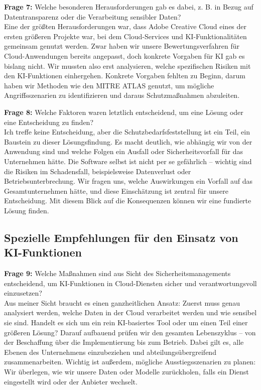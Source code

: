 \documentclass[
    12pt, 
    a4paper,
    ]{scrartcl} %
\begin{document}
\textbf{Frage 7:} Welche besonderen Herausforderungen gab es dabei, z. B. in Bezug auf Datentransparenz oder die Verarbeitung sensibler Daten? \\[0.5em]
Eine der größten Herausforderungen war, dass Adobe Creative Cloud eines der ersten größeren Projekte war, bei dem Cloud-Services und KI-Funktionalitäten gemeinsam genutzt werden. Zwar haben wir unsere Bewertungsverfahren für Cloud-Anwendungen bereits angepasst, doch konkrete Vorgaben für KI gab es bislang nicht. Wir mussten also erst analysieren, welche spezifischen Risiken mit den KI-Funktionen einhergehen. Konkrete Vorgaben fehlten zu Beginn, darum haben wir Methoden wie den MITRE ATLAS genutzt, um mögliche Angriffsszenarien zu identifizieren und daraus Schutzmaßnahmen abzuleiten.

\textbf{Frage 8:} Welche Faktoren waren letztlich entscheidend, um eine Lösung oder eine Entscheidung zu finden? \\[0.5em]
Ich treffe keine Entscheidung, aber die Schutzbedarfsfeststellung ist ein Teil, ein Baustein zu dieser Lösungsfindung. Es macht deutlich, wie abhängig wir von der Anwendung sind und welche Folgen ein Ausfall oder Sicherheitsvorfall für das Unternehmen hätte. Die Software selbst ist nicht per se gefährlich – wichtig sind die Risiken im Schadensfall, beispielsweise Datenverlust oder Betriebsunterbrechung. Wir fragen uns, welche Auswirkungen ein Vorfall auf das Gesamtunternehmen hätte, und diese Einschätzung ist zentral für unsere Entscheidung. Mit diesem Blick auf die Konsequenzen können wir eine fundierte Lösung finden.

\subsection*{Spezielle Empfehlungen für den Einsatz von KI-Funktionen}

\textbf{Frage 9:} Welche Maßnahmen sind aus Sicht des Sicherheitsmanagements entscheidend, um KI-Funktionen in Cloud-Diensten sicher und verantwortungsvoll einzusetzen? \\[0.5em]
Aus meiner Sicht braucht es einen ganzheitlichen Ansatz: Zuerst muss genau analysiert werden, welche Daten in der Cloud verarbeitet werden und wie sensibel sie sind. Handelt es sich um ein rein KI-basiertes Tool oder um einen Teil einer größeren Lösung? Darauf aufbauend prüfen wir den gesamten Lebenszyklus – von der Beschaffung über die Implementierung bis zum Betrieb. Dabei gilt es, alle Ebenen des Unternehmens einzubeziehen und abteilungsübergreifend zusammenarbeiten. Wichtig ist außerdem, mögliche Ausstiegsszenarien zu planen: Wir überlegen, wie wir unsere Daten oder Modelle zurückholen, falls ein Dienst eingestellt wird oder der Anbieter wechselt.
\end{document}

